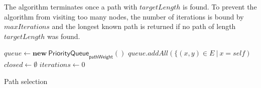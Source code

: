 The algorithm terminates once a path with $targetLength$ is found. To prevent the algorithm from visiting too many nodes, the number of iterations is bound by $maxIterations$ and the longest known path is returned if no path of length $targetLength$ was found.

\begin{algorithm}[H]
    \SetAlgoNoLine
    \DontPrintSemicolon
    \;
    $queue \leftarrow \mathbf{new} \ \mathsf{PriorityQueue}_{\textsf{pathWeight}}()$\;
    $queue.addAll(\{ (x,y) \in E \ | \ x = self)$\;
    $closed \leftarrow \emptyset$\;
    $iterations \leftarrow 0$\;
    \;
    \caption{Path selection}
\end{algorithm}
